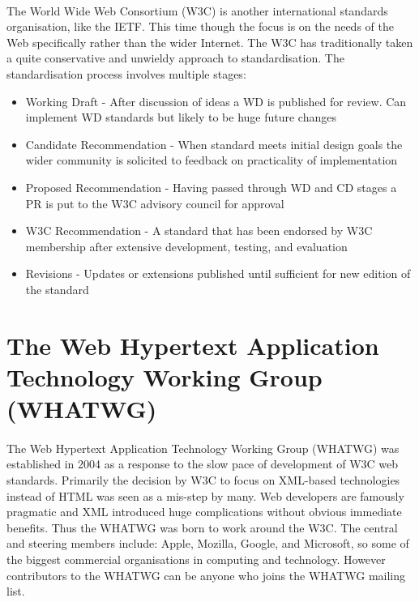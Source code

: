 \paragraph{} The World Wide Web Consortium (W3C) is another international standards organisation, like the IETF. This time though the focus is on the needs of the Web specifically rather than the wider Internet. The W3C has traditionally taken a quite conservative and unwieldy approach to standardisation. The standardisation process involves multiple stages:

\begin{itemize}
\item Working Draft - After discussion of ideas a WD is published for review. Can implement WD standards but likely to be huge future changes
\item Candidate Recommendation - When standard meets initial design goals the wider community is solicited to feedback on practicality of implementation
\item Proposed Recommendation - Having passed through WD and CD stages a PR is put to the W3C advisory council for approval
\item W3C Recommendation - A standard that has been endorsed by W3C membership after extensive development, testing, and evaluation
\item Revisions - Updates or extensions published until sufficient for new edition of the standard
\end{itemize}

\section{The Web Hypertext Application Technology Working Group (WHATWG)}
\paragraph{} The Web Hypertext Application Technology Working Group (WHATWG) was established in 2004 as a response to the slow pace of development of W3C web standards. Primarily the decision by W3C to focus on XML-based technologies instead of HTML was seen as a mis-step by many. Web developers are famously pragmatic and XML introduced huge complications without obvious immediate benefits. Thus the WHATWG was born to work around the W3C. The central and steering members include: Apple, Mozilla, Google, and Microsoft, so some of the biggest commercial organisations in computing and technology. However contributors to the WHATWG can be anyone who joins the WHATWG mailing list.
